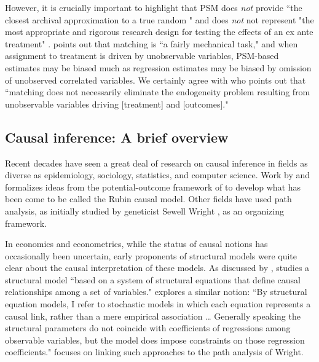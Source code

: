 \documentclass[11pt,reqno,titlepage]{amsart}
\begin{document}
\begin{doublespace}
However, it is crucially important to highlight that PSM does \emph{not} provide ``the closest archival approximation to a true random " and does \emph{not} not represent "the most appropriate and rigorous research design for testing the effects of an ex ante treatment" \citep[p.\,1429]{Kirk:2014gx}.
\citet[pp.\,73-75]{Rosenbaum:2009ul} points out that matching is ``a fairly mechanical  task," and when assignment to treatment is driven by unobservable variables, PSM-based estimates may be biased much as regression estimates may be biased by omission of unobserved correlated variables.
We certainly agree with \citet{MinuttiMeza:2014fn} who points out that ``matching does not necessarily eliminate the endogeneity problem resulting from unobservable variables driving [treatment] and [outcomes]."


\subsection{Causal inference: A brief overview}
Recent decades have seen a great deal of research on causal inference in fields as diverse as epidemiology, sociology, statistics, and computer science. 
Work by \citet{Rubin:1974im,Rubin:1977dv} and \citet{Holland:1986p7458} formalizes ideas from the potential-outcome framework of \citet{Neyman:1923aa} to develop what has been come to be called the Rubin causal model. 
Other fields have used path analysis, as initially studied by geneticist Sewell Wright \citep{Wright:1921:aa}, as an organizing framework.

In economics and econometrics, while the status of causal notions has occasionally been uncertain, early proponents of structural models were quite clear about the causal interpretation of these models.
As discussed by \citet{Heckman:2015ez}, \citet{Haavelmo:1943cl,Haavelmo:1944jq} studies a structural model ``based on a system of structural equations that define causal relationships among a set of variables."
\citet[p.\,979]{Goldberger:1972cq} explores a similar notion: ``By structural equation models, I refer to stochastic models in which each equation represents a causal link, rather than a mere empirical association \dots
Generally speaking the structural parameters do not coincide with coefficients of regressions among observable variables, but the model does impose constraints on those regression coefficients."
\citet{Goldberger:1972cq} focuses on linking such approaches to the path analysis of Wright.


\end{doublespace}
\end{document}
